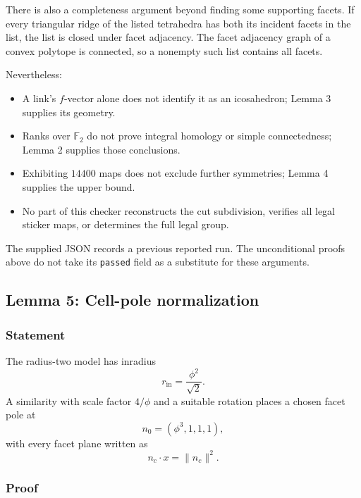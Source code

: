 \documentclass[
  10pt,
  a4paper,
]{article}
\newcounter{none} %
\providecommand{\tightlist}{%
  \setlength{\itemsep}{0pt}\setlength{\parskip}{0pt}}
\begin{document}
There is also a completeness argument beyond finding some supporting
facets. If every triangular ridge of the listed tetrahedra has both its
incident facets in the list, the list is closed under facet adjacency.
The facet adjacency graph of a convex polytope is connected, so a
nonempty such list contains all facets.

Nevertheless:

\begin{itemize}
\tightlist
\item
  A link's \(f\)-vector alone does not identify it as an icosahedron;
  Lemma 3 supplies its geometry.
\item
  Ranks over \(\mathbb F_2\) do not prove integral homology or simple
  connectedness; Lemma 2 supplies those conclusions.
\item
  Exhibiting \(14400\) maps does not exclude further symmetries; Lemma 4
  supplies the upper bound.
\item
  No part of this checker reconstructs the cut subdivision, verifies all
  legal sticker maps, or determines the full legal group.
\end{itemize}

The supplied JSON records a previous reported run. The unconditional
proofs above do not take its \texttt{passed} field as a substitute for
these arguments.

\subsection{Lemma 5: Cell-pole
normalization}\label{lemma-5-cell-pole-normalization}

\subsubsection{Statement}\label{statement-4}

The radius-two model has inradius \begin{equation}
r_{\mathrm{in}}=\frac{\phi^2}{\sqrt2}.
\end{equation} A similarity with scale factor \(4/\phi\) and a suitable
rotation places a chosen facet pole at \begin{equation}
n_0=(\phi^3,1,1,1),
\end{equation} with every facet plane written as \begin{equation}
n_c\cdot x=\|n_c\|^2.
\end{equation}

\subsubsection{Proof}\label{proof-4}
\end{document}
